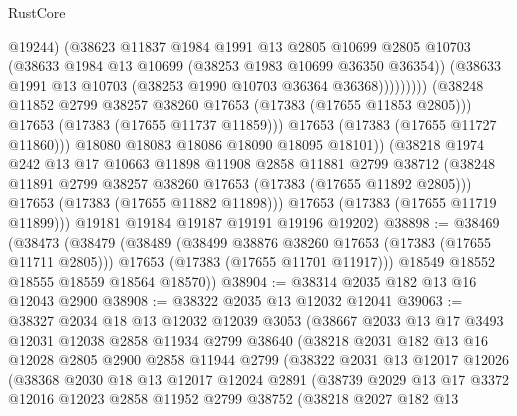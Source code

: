 \begin{lexlean}{RustCore}
\begin{coremodule}
                              @19244)
                            (@38623
                              @11837
                              @1984
                              @1991
                              @13
                              @2805
                              @10699
                              @2805
                              @10703
                              (@38633 @1984 @13 @10699 (@38253 @1983 @10699 @36350 @36354))
                              (@38633 @1991 @13 @10703 (@38253 @1990 @10703 @36364 @36368)))))))))
                (@38248 @11852 @2799 @38257 @38260 @17653 (@17383 (@17655 @11853 @2805)))
                @17653
                (@17383 (@17655 @11737 @11859)))
              @17653
              (@17383 (@17655 @11727 @11860)))
            @18080
            @18083
            @18086
            @18090
            @18095
            @18101))
        (@38218
          @1974
          @242
          @13
          @17
          @10663
          @11898
          @11908
          @2858
          @11881
          @2799
          @38712
          (@38248 @11891 @2799 @38257 @38260 @17653 (@17383 (@17655 @11892 @2805)))
          @17653
          (@17383 (@17655 @11882 @11898)))
        @17653
        (@17383 (@17655 @11719 @11899)))
      @19181
      @19184
      @19187
      @19191
      @19196
      @19202)
@38898 := @38469
    (@38473
      (@38479
        (@38489
          (@38499 @38876 @38260 @17653 (@17383 (@17655 @11711 @2805)))
          @17653
          (@17383 (@17655 @11701 @11917)))
        @18549
        @18552
        @18555
        @18559
        @18564
        @18570))
@38904 := @38314 @2035 @182 @13 @16 @12043 @2900
@38908 := @38322 @2035 @13 @12032 @12041
@39063 := @38327
    @2034
    @18
    @13
    @12032
    @12039
    @3053
    (@38667
      @2033
      @13
      @17
      @3493
      @12031
      @12038
      @2858
      @11934
      @2799
      @38640
      (@38218
        @2031
        @182
        @13
        @16
        @12028
        @2805
        @2900
        @2858
        @11944
        @2799
        (@38322
          @2031
          @13
          @12017
          @12026
          (@38368
            @2030
            @18
            @13
            @12017
            @12024
            @2891
            (@38739
              @2029
              @13
              @17
              @3372
              @12016
              @12023
              @2858
              @11952
              @2799
              @38752
              (@38218
                @2027
                @182
                @13

\end{coremodule}
\end{lexlean}
